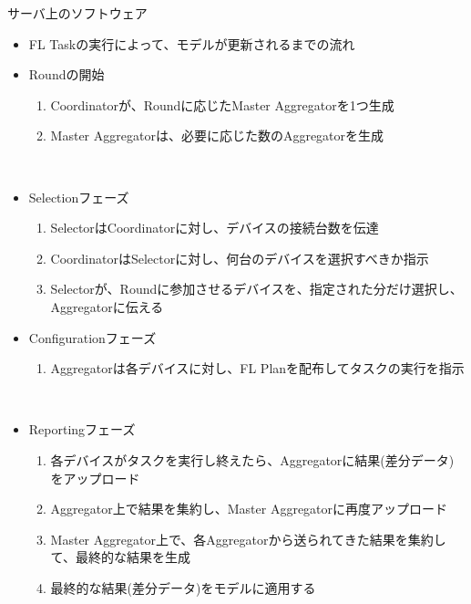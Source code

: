 \documentclass[dvipdfmx,notheorems,t]{beamer}
\begin{document}
\begin{frame}{サーバ上のソフトウェア}

\begin{itemize}
	\item FL Taskの実行によって、モデルが更新されるまでの流れ
	\newline
	
	\item Roundの開始
	\begin{enumerate}
		\item Coordinatorが、Roundに応じたMaster Aggregatorを1つ生成
		\newline
		\item Master Aggregatorは、必要に応じた数のAggregatorを生成
	\end{enumerate} \
	
	\item Selectionフェーズ
	\begin{enumerate}
		\item SelectorはCoordinatorに対し、デバイスの接続台数を伝達
		\newline
		\item CoordinatorはSelectorに対し、何台のデバイスを選択すべきか指示
		\newline
		\item Selectorが、Roundに参加させるデバイスを、指定された分だけ選択し、Aggregatorに伝える
	\end{enumerate}
	
	\framebreak
	
	\item Configurationフェーズ
	\begin{enumerate}
		\item Aggregatorは各デバイスに対し、FL Planを配布してタスクの実行を指示
	\end{enumerate} \
	
	\item Reportingフェーズ
	\begin{enumerate}
		\item 各デバイスがタスクを実行し終えたら、Aggregatorに結果(差分データ)をアップロード
		\newline
		\item Aggregator上で結果を集約し、Master Aggregatorに再度アップロード
		\newline
		\item Master Aggregator上で、各Aggregatorから送られてきた結果を集約して、最終的な結果を生成
		\newline
		\item 最終的な結果(差分データ)をモデルに適用する
	\end{enumerate}
\end{itemize}

\end{frame}
\end{document}
